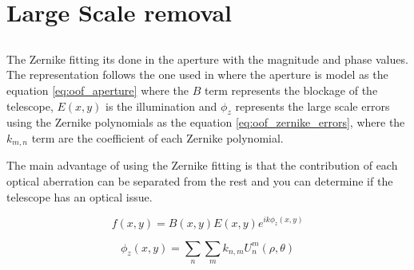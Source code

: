 \section{Large Scale removal}


\subsection{}
The Zernike fitting its done in the aperture with the magnitude and phase values. The representation follows the one used in  where the aperture is model as the equation \ref{eq:oof_aperture} where the $B$ term represents the blockage of the telescope, $E(x,y)$ is the illumination and $\phi_z$ represents the large scale errors using the Zernike polynomials as the equation \ref{eq:oof_zernike_errors}, where the $k_{m,n}$ term are the coefficient of each Zernike polynomial.


The main advantage of using the Zernike fitting is that the contribution of each optical aberration can be separated from the rest and you can determine if the telescope has an optical issue.


\begin{equation}
    f(x,y) = B(x,y)E(x,y)e^{i k \phi_z(x,y)}
    \label{eq:oof_aperture}
\end{equation}

\begin{equation}
    \phi_z(x,y) =  \sum_n \sum_m k_{n,m}U^{m}_{n}(\rho, \theta)
    \label{eq:oof_zernike_errors}
\end{equation}

